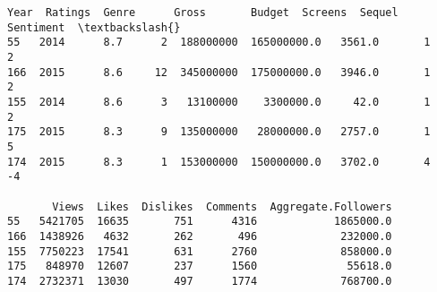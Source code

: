             \begin{tcolorbox}[breakable, size=fbox, boxrule=.5pt, pad at break*=1mm, opacityfill=0]
\begin{Verbatim}[commandchars=\\\{\}]
     Year  Ratings  Genre      Gross       Budget  Screens  Sequel  Sentiment  \textbackslash{}
55   2014      8.7      2  188000000  165000000.0   3561.0       1          2
166  2015      8.6     12  345000000  175000000.0   3946.0       1          2
155  2014      8.6      3   13100000    3300000.0     42.0       1          2
175  2015      8.3      9  135000000   28000000.0   2757.0       1          5
174  2015      8.3      1  153000000  150000000.0   3702.0       4         -4

       Views  Likes  Dislikes  Comments  Aggregate.Followers
55   5421705  16635       751      4316            1865000.0
166  1438926   4632       262       496             232000.0
155  7750223  17541       631      2760             858000.0
175   848970  12607       237      1560              55618.0
174  2732371  13030       497      1774             768700.0
\end{Verbatim}
\end{tcolorbox}
